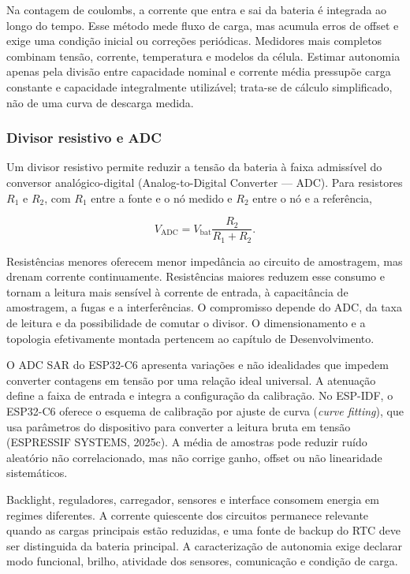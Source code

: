 \documentclass[a4paper,12pt]{article}
\begin{document}
Na contagem de coulombs, a corrente que entra e sai da bateria \'e integrada ao longo do tempo. Esse m\'etodo mede fluxo de carga, mas acumula erros de offset e exige uma condi\c{c}\~ao inicial ou corre\c{c}\~oes peri\'odicas. Medidores mais completos combinam tens\~ao, corrente, temperatura e modelos da c\'elula. Estimar autonomia apenas pela divis\~ao entre capacidade nominal e corrente m\'edia pressup\~oe carga constante e capacidade integralmente utiliz\'avel; trata-se de c\'alculo simplificado, n\~ao de uma curva de descarga medida.


\subsubsection{Divisor resistivo e ADC}


Um divisor resistivo permite reduzir a tens\~ao da bateria \`a faixa admiss\'ivel do conversor anal\'ogico-digital (Analog-to-Digital Converter --- ADC). Para resistores \(R_1\) e \(R_2\), com \(R_1\) entre a fonte e o n\'o medido e \(R_2\) entre o n\'o e a refer\^encia,


\[
V_{\mathrm{ADC}}=V_{\mathrm{bat}}\frac{R_2}{R_1+R_2}.
\]


Resist\^encias menores oferecem menor imped\^ancia ao circuito de amostragem, mas drenam corrente continuamente. Resist\^encias maiores reduzem esse consumo e tornam a leitura mais sens\'ivel \`a corrente de entrada, \`a capacit\^ancia de amostragem, a fugas e a interfer\^encias. O compromisso depende do ADC, da taxa de leitura e da possibilidade de comutar o divisor. O dimensionamento e a topologia efetivamente montada pertencem ao cap\'itulo de Desenvolvimento.


O ADC SAR do ESP32-C6 apresenta varia\c{c}\~oes e n\~ao idealidades que impedem converter contagens em tens\~ao por uma rela\c{c}\~ao ideal universal. A atenua\c{c}\~ao define a faixa de entrada e integra a configura\c{c}\~ao da calibra\c{c}\~ao. No ESP-IDF, o ESP32-C6 oferece o esquema de calibra\c{c}\~ao por ajuste de curva (\emph{curve fitting}), que usa par\^ametros do dispositivo para converter a leitura bruta em tens\~ao (ESPRESSIF SYSTEMS, 2025c). A m\'edia de amostras pode reduzir ru\'ido aleat\'orio n\~ao correlacionado, mas n\~ao corrige ganho, offset ou n\~ao linearidade sistem\'aticos.


Backlight, reguladores, carregador, sensores e interface consomem energia em regimes diferentes. A corrente quiescente dos circuitos permanece relevante quando as cargas principais est\~ao reduzidas, e uma fonte de backup do RTC deve ser distinguida da bateria principal. A caracteriza\c{c}\~ao de autonomia exige declarar modo funcional, brilho, atividade dos sensores, comunica\c{c}\~ao e condi\c{c}\~ao de carga.
\end{document}
